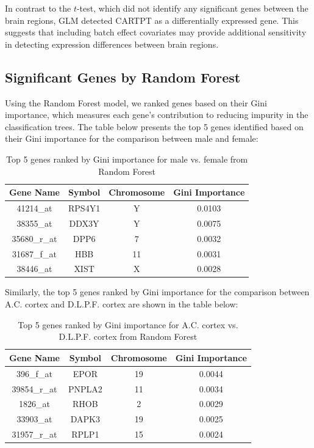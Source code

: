 \documentclass[12pt]{article}
\begin{document}
In contrast to the $t$-test, which did not identify any significant genes between the brain regions, GLM detected CARTPT as a differentially expressed gene. This suggests that including batch effect covariates may provide additional sensitivity in detecting expression differences between brain regions.

\subsection{Significant Genes by Random Forest}

Using the Random Forest model, we ranked genes based on their Gini importance, which measures each gene’s contribution to reducing impurity in the classification trees. The table below presents the top 5 genes identified based on their Gini importance for the comparison between male and female:

\begin{table}[h!]
\centering
\begin{tabular}{|c|c|c|c|}
\hline
\textbf{Gene Name} & \textbf{Symbol} & \textbf{Chromosome} & \textbf{Gini Importance} \\
\hline
41214\_at & RPS4Y1 & Y & 0.0103 \\
38355\_at & DDX3Y & Y & 0.0075 \\
35680\_r\_at & DPP6 & 7 & 0.0032 \\
31687\_f\_at & HBB & 11 & 0.0031 \\
38446\_at & XIST & X & 0.0028 \\
\hline
\end{tabular}
\caption{Top 5 genes ranked by Gini importance for male vs. female from Random Forest}
\end{table}

Similarly, the top 5 genes ranked by Gini importance for the comparison between A.C. cortex and D.L.P.F. cortex are shown in the table below:

\begin{table}[h!]
\centering
\begin{tabular}{|c|c|c|c|}
\hline
\textbf{Gene Name} & \textbf{Symbol} & \textbf{Chromosome} & \textbf{Gini Importance} \\
\hline
396\_f\_at & EPOR & 19 & 0.0044 \\
39854\_r\_at & PNPLA2 & 11 & 0.0034 \\
1826\_at & RHOB & 2 & 0.0029 \\
33903\_at & DAPK3 & 19 & 0.0025 \\
31957\_r\_at & RPLP1 & 15 & 0.0024 \\
\hline
\end{tabular}
\caption{Top 5 genes ranked by Gini importance for A.C. cortex vs. D.L.P.F. cortex from Random Forest}
\end{table}
\end{document}
